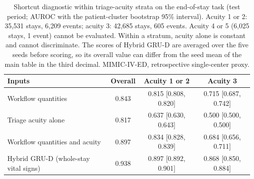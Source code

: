 \begin{table}[t]
\centering
\caption{Shortcut diagnostic within triage-acuity strata on the end-of-stay task (test period; AUROC with the patient-cluster bootstrap 95\% interval). Acuity 1 or 2: 35,531 stays, 6,209 events; acuity 3: 42,685 stays, 605 events. Acuity 4 or 5 (6,025 stays, 1 event) cannot be evaluated. Within a stratum, acuity alone is constant and cannot discriminate. The scores of Hybrid GRU-D are averaged over the five seeds before scoring, so its overall value can differ from the seed mean of the main table in the third decimal. MIMIC-IV-ED, retrospective single-center proxy.}
\label{tab:acuity-shortcut}
\begin{tabular}{lccc}
\toprule
Inputs & Overall & Acuity 1 or 2 & Acuity 3 \\
\midrule
Workflow quantities & 0.843 & 0.815 [0.808, 0.820] & 0.715 [0.687, 0.742] \\
Triage acuity alone & 0.817 & 0.637 [0.630, 0.643] & 0.500 [0.500, 0.500] \\
Workflow quantities and acuity & 0.897 & 0.834 [0.828, 0.839] & 0.684 [0.656, 0.711] \\
Hybrid GRU-D (whole-stay vital signs) & 0.938 & 0.897 [0.892, 0.901] & 0.868 [0.850, 0.884] \\
\bottomrule
\end{tabular}
\end{table}
